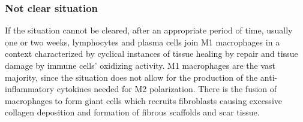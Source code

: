 		\subsubsection{Not clear situation}
		If the situation cannot be cleared, after an appropriate period of time, usually one or two weeks, lymphocytes and plasma cells join M1 macrophages in a context characterized by cyclical instances of tissue healing by repair and tissue damage by immune cells’ oxidizing activity.
		M1 macrophages are the vast majority, since the situation does not allow for the production of the anti-inflammatory cytokines needed for M2 polarization.
		There is the fusion of macrophages to form giant cells which recruits fibroblasts causing excessive collagen deposition and formation of fibrous scaffolds and scar tissue.
